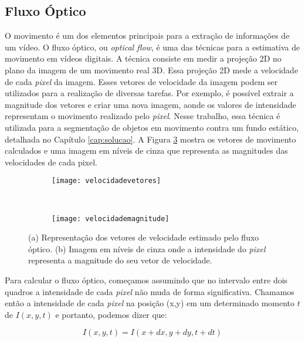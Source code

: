 \subsection{Fluxo Óptico}\label{sec:fluxooptico}

O movimento é um dos elementos principais para a extração de informações de um vídeo. O fluxo óptico, ou \textit{optical flow}, é uma das técnicas para a estimativa de movimento em vídeos digitais. A técnica consiste em medir a projeção 2D no plano da imagem de um movimento real 3D\cite{mota2011tensor}. Essa projeção 2D mede a velocidade de cada \textit{pixel} da imagem. Esses vetores de velocidade da imagem podem ser utilizados para a realização de diversas tarefas. Por exemplo, é possível extrair a magnitude dos vetores e criar uma nova imagem, aonde os valores de intensidade representam o movimento realizado pelo \textit{pixel}. Nesse trabalho, essa técnica é utilizada para a segmentação de objetos em movimento contra um fundo estático, detalhada no Capítulo \ref{cap:solucao}. A Figura \ref{fig:fluxo} mostra os vetores de movimento calculados e uma imagem em níveis de cinza que representa as magnitudes das velocidades de cada pixel.

\begin{figure}
 \centering
\begin{subfigure}{.5\textwidth}
  \centering
  \texttt{[image: velocidadevetores]}
	\caption{}
	\label{fig:fluxo:sub:vetores}
	\centering
\end{subfigure}\
\begin{subfigure}{.5\textwidth}
  \centering
  \texttt{[image: velocidademagnitude]}
	\caption{}
	\label{fig:fluxo:sub:magnitude}
	\centering
\end{subfigure}
\caption{(a) Representação dos vetores de velocidade estimado pelo fluxo óptico. (b) Imagem em níveis de cinza onde a intensidade do \textit{pixel} representa a magnitude do seu vetor de velocidade.}
\label{fig:fluxo}
\centering
\end{figure}

Para calcular o fluxo óptico, começamos assumindo que no intervalo entre dois quadros a intensidade de cada \textit{pixel} não muda de forma significativa. Chamamos então a intensidade de cada \textit{pixel} na posição (x,y) em um determinado momento $t$ de $I(x,y,t)$ e portanto, podemos dizer que: 

\begin{equation}
	I(x,y,t) = I(x+dx, y+dy, t+dt)
\label{eq:fluxo1}
\end{equation} 

